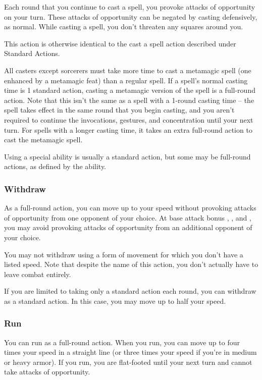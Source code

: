 Each round that you continue to cast a spell, you provoke attacks of opportunity on your turn. These attacks of opportunity can be negated by casting defensively, as normal. While casting a spell, you don't threaten any squares around you.

This action is otherwise identical to the cast a spell action described under Standard Actions.

 All casters except sorcerers must take more time to cast a metamagic spell (one enhanced by a metamagic feat) than a regular spell. If a spell's normal casting time is 1 standard action, casting a metamagic version of the spell is a full-round action. Note that this isn't the same as a spell with a 1-round casting time -- the spell takes effect in the same round that you begin casting, and you aren't required to continue the invocations, gestures, and concentration until your next turn. For spells with a longer casting time, it takes an extra full-round action to cast the metamagic spell.

Using a special ability is usually a standard action, but some may be full-round actions, as defined by the ability.

\subsubsection{Withdraw}
As a full-round action, you can move up to your speed without provoking attacks of opportunity from one opponent of your choice. At base attack bonus , , and , you may avoid provoking attacks of opportunity from an additional opponent of your choice.

You may not withdraw using a form of movement for which you don't have a listed speed. Note that despite the name of this action, you don't actually have to leave combat entirely.

 If you are limited to taking only a standard action each round, you can withdraw as a standard action. In this case, you may move up to half your speed.

\subsubsection{Run}
You can run as a full-round action. When you run, you can move up to four times your speed in a straight line (or three times your speed if you're in medium or heavy armor). If you run, you are flat-footed until your next turn and cannot take attacks of opportunity.

